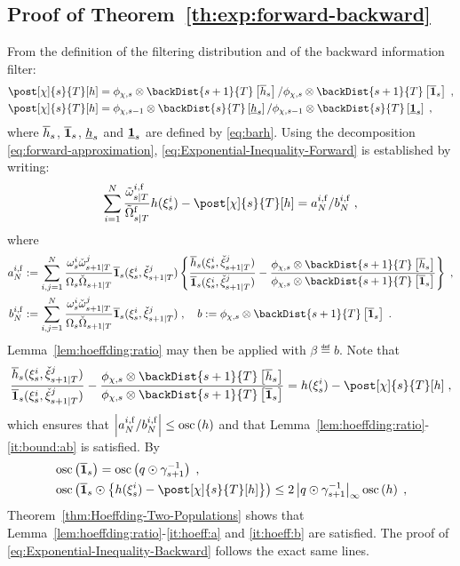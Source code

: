 \subsection{Proof of Theorem~\ref{th:exp:forward-backward}}
\label{proof:th:exp:forward-backward}
From the definition of the filtering distribution and of the backward information filter:
\begin{align*}
& \post[\Xinit]{s}{T}[h] = \filt{\Xinit,s}\otimes\backDist{s+1}{T}\left[\fup{h}{s}\right]/\filt{\Xinit,s}\otimes\backDist{s+1}{T}\left[\fup{\1}{s}\right] \eqsp, \\
& \post[\Xinit]{s}{T}[h] = \filt{\Xinit,s-1}\otimes\backDist{s}{T}\left[\fdown{h}{s}\right]/\filt{\Xinit,s-1}\otimes\backDist{s}{T}\left[\fdown{\1}{s}\right]\eqsp,
\end{align*}
where $\overline{h}_{s}$, $\overline{\mathbf{1}}_{s}$, $\underline{h}_{s}$ and $\underline{\mathbf{1}}_{s}$ are defined by \eqref{eq:barh}. Using the decomposition \eqref{eq:forward-approximation},  \eqref{eq:Exponential-Inequality-Forward} is established by writing:
\[
\sum_{i=1}^N \frac{\smwght{s}{T}{i, \mathrm{f}}}{\tilde{\Omega}^{\mathrm{f}}_{s|T}} h(\epart{s}{i}) - \post[\Xinit]{s}{T} [h] = a_N^{i, \mathrm{f}}/b_N^{i, \mathrm{f}}\eqsp,
\]
where
\begin{align*}
a_N^{i, \mathrm{f}}&\eqdef \sum_{i,j=1}^N \frac{\ewght{s}{i} \ebackwght{s+1}{T}{j}}{\sumwght{s}\backsumwght{s+1}{T}}\fup{\1}{s}(\epart{s}{i},\ebackpart{s+1}{T}{j})\left\{\frac{\fup{h}{s}(\epart{s}{i},\ebackpart{s+1}{T}{j})}{\fup{\1}{s}(\epart{s}{i},\ebackpart{s+1}{T}{j})}-\frac{\filt{\Xinit,s}\otimes\backDist{s+1}{T}\left[\fup{h}{s}\right]}{\filt{\Xinit,s}\otimes\backDist{s+1}{T}\left[\fup{\1}{s}\right]}\right\}\eqsp,\\
b_N^{i, \mathrm{f}} & \eqdef \sum_{i,j=1}^N \frac{\ewght{s}{i} \ebackwght{s+1}{T}{j}}{\sumwght{s}\backsumwght{s+1}{T}}  \fup{\1}{s}(\epart{s}{i},\ebackpart{s+1}{T}{j})\eqsp,\quad b\eqdef \filt{\Xinit,s}\otimes\backDist{s+1}{T}\left[\fup{\1}{s}\right]\eqsp.
\end{align*}
Lemma~\ref{lem:hoeffding:ratio} may then be applied with $\beta \eqdef b$. Note that
\[
\frac{\fup{h}{s}(\epart{s}{i},\ebackpart{s+1}{T}{j})}{\fup{\1}{s}(\epart{s}{i},\ebackpart{s+1}{T}{j})}-\frac{\filt{\Xinit,s}\otimes\backDist{s+1}{T}\left[\fup{h}{s}\right]}{\filt{\Xinit,s}\otimes\backDist{s+1}{T}\left[\fup{\1}{s}\right]} =  h(\epart{s}{i}) -  \post[\Xinit]{s}{T}[h]\eqsp,
\]
which ensures that $\left |a_N^{i, \mathrm{f}}/b_N^{i, \mathrm{f}}\right|\le \oscnorm{h}$ and that Lemma~\ref{lem:hoeffding:ratio}-\eqref{it:bound:ab} is satisfied. By
\begin{align*}
&\oscnorm{\fup{\1}{s}} = \oscnorm{ q\odot \gamma_{s+1}^{-1}}\eqsp,\\
&\oscnorm{\fup{\1}{s}\odot\left\{h(\epart{s}{i}) -  \post[\Xinit]{s}{T}[h]\right\}} \le 2 \esssup{q\odot \gamma_{s+1}^{-1}}\oscnorm{h}\eqsp,
\end{align*}
Theorem~\ref{thm:Hoeffding-Two-Populations} shows that Lemma~\ref{lem:hoeffding:ratio}-\eqref{it:hoeff:a} and \eqref{it:hoeff:b} are satisfied. The proof of \eqref{eq:Exponential-Inequality-Backward} follows the exact same lines.

